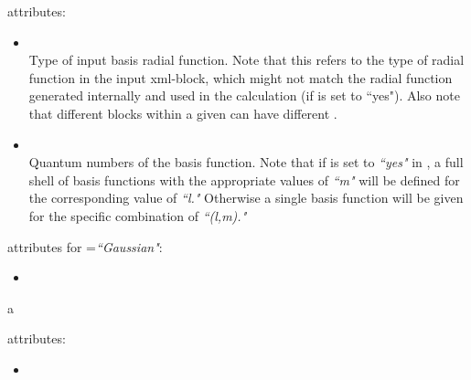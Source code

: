  attributes:

\begin{itemize}
\item {}\\
  Type of input basis radial function. Note that this refers to the type of radial function in the input xml-block, which might not match the radial function generated internally and used in the calculation (if  is set to ``yes"). Also note that different  blocks within a given  can have different .
\item {}\\
  Quantum numbers of the basis function. Note that if
 is set to \textit{``yes"} in , a
full shell of basis functions with the appropriate values of
\textit{``m"} will be defined for the corresponding value of
\textit{``l."} Otherwise a single basis function will be given for the
specific combination of \textit{``(l,m)."}
\end{itemize}

 attributes for =\textit{``Gaussian"}:

\begin{itemize}
\item {}\\
\end{itemize}a

 attributes:

\begin{itemize}
\item {}\\
\end{itemize}



